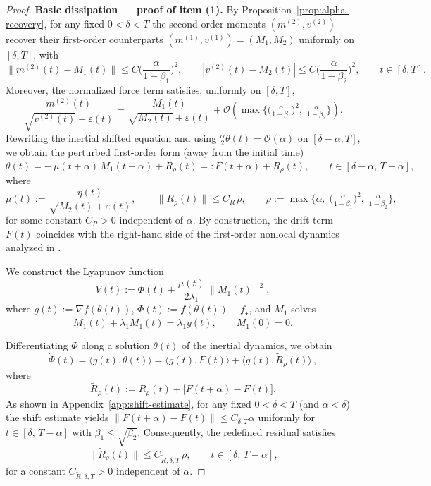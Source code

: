 \documentclass{article} %
\begin{document}
\begin{proof}
\textbf{Basic dissipation — proof of item (1).}
By Proposition~\ref{prop:alpha-recovery}, for any fixed $0<\delta<T$ the second-order moments $(m^{(2)},v^{(2)})$ recover their first-order counterparts $(m^{(1)},v^{(1)})=(M_1,M_2)$ uniformly on $[\delta,T]$, with
\[
\|m^{(2)}(t)-M_1(t)\|\le C\Big(\frac{\alpha}{1-\beta_1}\Big)^2,
\qquad
|v^{(2)}(t)-M_2(t)|\le C\Big(\frac{\alpha}{1-\beta_2}\Big)^2,
\qquad t\in[\delta,T].
\]
Moreover, the normalized force term satisfies, uniformly on $[\delta,T]$,
\[
\frac{m^{(2)}(t)}{\sqrt{v^{(2)}(t)}+\varepsilon(t)}
=
\frac{M_1(t)}{\sqrt{M_2(t)}+\varepsilon(t)} + \mathcal{O}\!\left(
\max\Big\{\Big(\tfrac{\alpha}{1-\beta_1}\Big)^2,\;\tfrac{\alpha}{1-\beta_2}\Big\}
\right).
\]
Rewriting the inertial shifted equation and using $\frac{\alpha}{2}\ddot\theta(t)=\mathcal{O}(\alpha)$ on $[\delta-\alpha,T]$, we obtain the perturbed first-order form (away from the initial time)
\[
\dot\theta(t)
=
-\,\mu(t+\alpha)\,M_1(t+\alpha) + R_\rho(t)
=: F(t+\alpha)+R_\rho(t),
\qquad t\in[\delta-\alpha,\,T-\alpha],
\]
where
\[
\mu(t):=\frac{\eta(t)}{\sqrt{M_2(t)}+\varepsilon(t)},
\qquad
\|R_\rho(t)\|\le C_R\,\rho,
\qquad
\rho:=\max\Big\{\alpha,\;\Big(\tfrac{\alpha}{1-\beta_1}\Big)^2,\;\tfrac{\alpha}{1-\beta_2}\Big\},
\]
for some constant $C_R>0$ independent of $\alpha$. By construction, the drift term $F(t)$ coincides with the right-hand side of the first-order nonlocal dynamics analyzed in
\cite{heredia2025modelingadagradrmspropadam}.

We construct the Lyapunov function
\[
V(t) := \Phi(t) + \frac{\mu(t)}{2\lambda_1}\,\|M_1(t)\|^2,
\]
where $g(t):=\nabla f(\theta(t))$, $\Phi(t) := f(\theta(t)) - f_\star$, and $M_1$ solves
\[
\dot M_1(t) + \lambda_1 M_1(t) = \lambda_1 g(t),
\qquad M_1(0)=0.
\]

Differentiating $\Phi$ along a solution $\theta(t)$ of the inertial dynamics, we obtain
\[
\dot\Phi(t)
= \langle g(t),\dot\theta(t)\rangle
= \langle g(t),F(t)\rangle + \langle g(t),\widetilde R_\rho(t)\rangle\,,
\]
where
\[
\widetilde R_\rho(t)
:= R_\rho(t) + \bigl[F(t+\alpha)-F(t)\bigr].
\]
As shown in Appendix~\ref{app:shift-estimate}, for any fixed $0<\delta<T$ (and $\alpha<\delta$) the
shift estimate yields $\|F(t+\alpha)-F(t)\|\le C_{\delta,T}\alpha$ uniformly for $t\in[\delta,\,T-\alpha]$ with $\beta_1\leq \sqrt{\beta_2}$. Consequently, the redefined residual satisfies
\[
\|\widetilde R_\rho(t)\|\le C_{\widetilde R,\delta,T}\,\rho,
\qquad t\in[\delta,\,T-\alpha],
\]
for a constant $C_{\widetilde R,\delta,T}>0$ independent of $\alpha$.


\end{proof}
\end{document}
